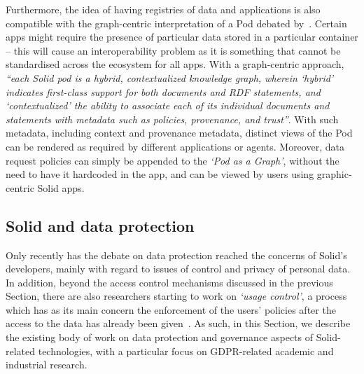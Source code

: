 Furthermore, the idea of having registries of data and applications is also compatible with the graph-centric interpretation of a Pod debated by~\cite{dedecker_whats_2022}. Certain apps might require the presence of particular data stored in a particular container -- this will cause an interoperability problem as it is something that cannot be standardised across the ecosystem for all apps.
With a graph-centric approach, \textit{``each Solid pod is a hybrid, contextualized knowledge graph, wherein `hybrid' indicates first-class support for both documents and RDF statements, and `contextualized' the ability to associate each of its individual documents and statements with metadata such as policies, provenance, and trust''}.
With such metadata, including context and provenance metadata, distinct views of the Pod can be rendered as required by different applications or agents.
Moreover, data request policies can simply be appended to the \textit{`Pod as a Graph'}, without the need to have it hardcoded in the app, and can be viewed by users using graphic-centric Solid apps.

\subsection{Solid and data protection}
\label{sec:sota_solid_data_protection}

Only recently has the debate on data protection reached the concerns of Solid's developers, mainly with regard to issues of control and privacy of personal data.
In addition, beyond the access control mechanisms discussed in the previous Section, there are also researchers starting to work on \textit{`usage control'}, a process which has as its main concern the enforcement of the users' policies after the access to the data has already been given~\citep{akaichi_semantic_2022,havur_greater_2020}.
As such, in this Section, we describe the existing body of work on data protection and governance aspects of Solid-related technologies, with a particular focus on GDPR-related academic and industrial research.

